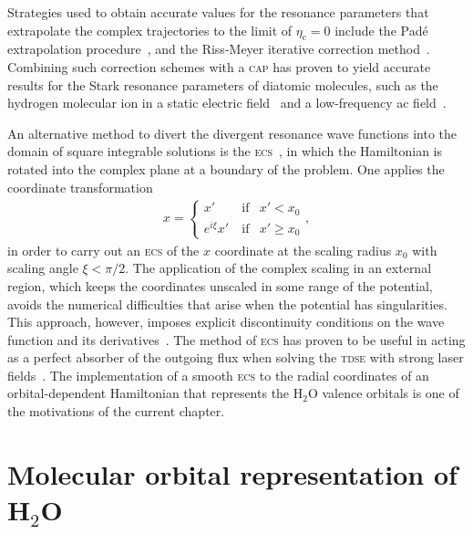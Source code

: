 Strategies used to obtain accurate values for the resonance parameters
that extrapolate the complex trajectories to the limit of
$\eta_{\mathrm{c}} = 0$ include the Pad\'{e} extrapolation
procedure~\cite{Moiseyev_Pade_2005}, and the Riss-Meyer iterative
correction method~\cite{RissMeyer_1993}. Combining such correction
schemes with a \textsc{cap} has proven to yield accurate results for
the Stark resonance parameters of diatomic molecules, such as the
hydrogen molecular ion in a static electric field~\cite{Tsog_2013} and
a low-frequency ac field~\cite{Tsog_H2mol_ac_2013}.

An alternative method to divert the divergent resonance wave functions
into the domain of square integrable solutions is the
\textsc{ecs}~\cite{Simon_1979}, in which the Hamiltonian is rotated
into the complex plane at a boundary of the problem. One applies the
coordinate transformation
%
\begin{eqnarray}
  x = \left\{
  \begin{split}
    x'~~~ & \mathrm{~if} & x' < x_{0} \\
    e^{i\xi} x' & \mathrm{~if} & x' \geq x_{0}
  \end{split}
  \right.
  ,
  \label{eq:ecs}
\end{eqnarray}
%
in order to carry out an \textsc{ecs} of the $x$ coordinate at the
scaling radius $x_{0}$ with scaling angle $\xi < \pi/2$. The
application of the complex scaling in an external region, which keeps
the coordinates unscaled in some range of the potential, avoids the
numerical difficulties that arise when the potential has
singularities. This approach, however, imposes explicit discontinuity
conditions on the wave function and its
derivatives~\cite{ScrinziJChemPhys_ECS}. The method of \textsc{ecs}
has proven to be useful in acting as a perfect absorber of the
outgoing flux when solving the \textsc{tdse} with strong laser
fields~\cite{ecsScrinzi}. The implementation of a smooth \textsc{ecs}
to the radial coordinates of an orbital-dependent Hamiltonian that
represents the H$_{2}$O valence orbitals is one of the motivations of
the current chapter.



\section{Molecular orbital representation of H$_{2}$O}
\label{ch:h2o_structure}


